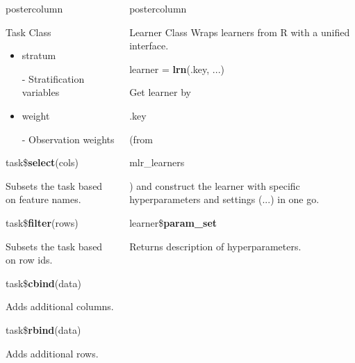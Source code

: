 \documentclass{beamer}
\newlength{\columnheight} %
\newcommand{\codeinline}[1]{\begin{codeboxinline}#1\end{codeboxinline}}
\begin{document}
\begin{frame}[fragile]{}
\begin{columns}
\begin{column}{.245\textwidth}
\begin{beamercolorbox}[center]{postercolumn}
\begin{minipage}{.98\textwidth}
{\begin{myblock}{Task Class}
\begin{itemize}
							\item \codeinline{stratum} - Stratification variables
							\item \codeinline{weight} - Observation weights
						\end{itemize}
						\vspace{1em}
						\begin{codebox}
							task\$\textbf{select}(cols)
						\end{codebox}
						Subsets the task based on feature names.
						\\
						\begin{codebox}
							task\$\textbf{filter}(rows)
						\end{codebox}
						Subsets the task based on row ids.
						\\
						\begin{codebox}
							task\$\textbf{cbind}(data)
						\end{codebox}
						Adds additional columns.
						\\
						\begin{codebox}
							task\$\textbf{rbind}(data)
						\end{codebox}
						Adds additional rows.
					\end{myblock}
					\vfill
					}
				\end{minipage}
			\end{beamercolorbox}
		\end{column}
		\begin{column}{.245\textwidth}
			\begin{beamercolorbox}[center]{postercolumn}
				\begin{minipage}{.98\textwidth}
					\parbox[t][\columnheight]{\textwidth}{
						\begin{myblock}{Learner Class}
						Wraps learners from R with a unified interface.
						\\
						\begin{codebox}
							learner = \textbf{lrn}(.key, ...)
						\end{codebox}
						Get learner by \codeinline{.key} (from \codeinline{mlr\_learners}) and construct the learner with specific hyperparameters and settings (...) in one go.
						\\
						\vspace{1em}
						\begin{codebox}
							learner\$\textbf{param\_set}
						\end{codebox}
						Returns description of hyperparameters.	
						\\

\end{myblock}}
\end{minipage}
\end{beamercolorbox}
\end{column}
\end{columns}
\end{frame}
\end{document}
